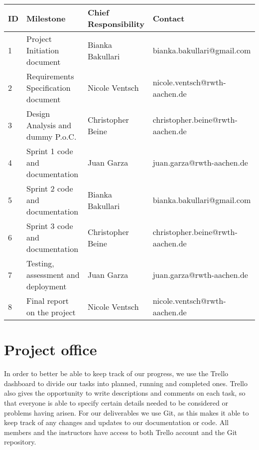 \documentclass[notitlepage]{article}
\begin{document}
\begin{flushleft}
\begin{center}
  \begin{tabular}{ m{0.4cm} m{5cm} m{5cm} m{6cm} }
  	\hline
		ID & Milestone & Chief Responsibility & Contact \\ \hline
		1 & Project Initiation document & Bianka Bakullari & bianka.bakullari@gmail.com \\ \hline
		2 & Requirements Specification document & Nicole Ventsch & nicole.ventsch@rwth-aachen.de \\ \hline
		3 & Design Analysis and dummy P.o.C. & Christopher Beine & christopher.beine@rwth-aachen.de \\ \hline
		4 & Sprint 1 code and documentation & Juan Garza  & 
		juan.garza@rwth-aachen.de
		\\ \hline
		5 & Sprint 2 code and documentation & Bianka Bakullari & bianka.bakullari@gmail.com \\ \hline
		6 & Sprint 3 code and documentation & Christopher Beine & christopher.beine@rwth-aachen.de \\ \hline
		7 & Testing, assessment and deployment & Juan Garza & 
		juan.garza@rwth-aachen.de 
		\\ \hline
		8 & Final report on the project & Nicole Ventsch & nicole.ventsch@rwth-aachen.de \\ \hline
	\end{tabular}
\end{center}













\section{Project office}

In order to better be able to keep track of our progress, we use the Trello dashboard to divide our tasks into planned, running and completed ones.
Trello also gives the opportunity to write descriptions and comments on each task, so that everyone is able to specify certain details needed to be considered or problems having arisen.
For our deliverables we use Git, as this makes it able to keep track of any changes and updates to our documentation or code.
All members and the instructors have access to both Trello account and the Git repository.

%
%  




\end{flushleft}
%
\end{document}
